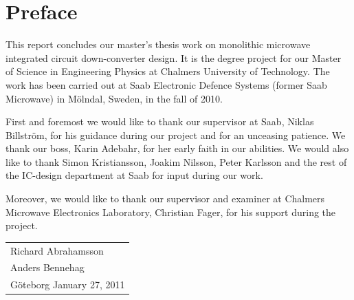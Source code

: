 	
	


\newpage
\ifdefined\saab
\else
	\clearpage
	\thispagestyle{empty}
\fi

\section*{Preface}
	This report concludes our master's thesis work on monolithic microwave integrated circuit down-converter design. It is the degree project for our Master of Science in Engineering Physics at Chalmers University of Technology. The work has been carried out at Saab Electronic Defence Systems (former Saab Microwave) in Mölndal, Sweden, in the fall of 2010.
	
	First and foremost we would like to thank our supervisor at Saab, Niklas Billström, for his guidance during our project and for an unceasing patience. We thank our boss, Karin Adebahr, for her early faith in our abilities. We would also like to thank Simon Kristiansson, Joakim Nilsson, Peter Karlsson and the rest of the IC-design department at Saab for input during our work.
	
	Moreover, we would like to thank our supervisor and examiner at Chalmers Microwave Electronics Laboratory, Christian Fager, for his support during the project.\\[1cm]

\hfill
\begin{tabular}{ l }
Richard Abrahamsson \\
Anders Bennehag \\
Göteborg January 27, 2011
\end{tabular}
